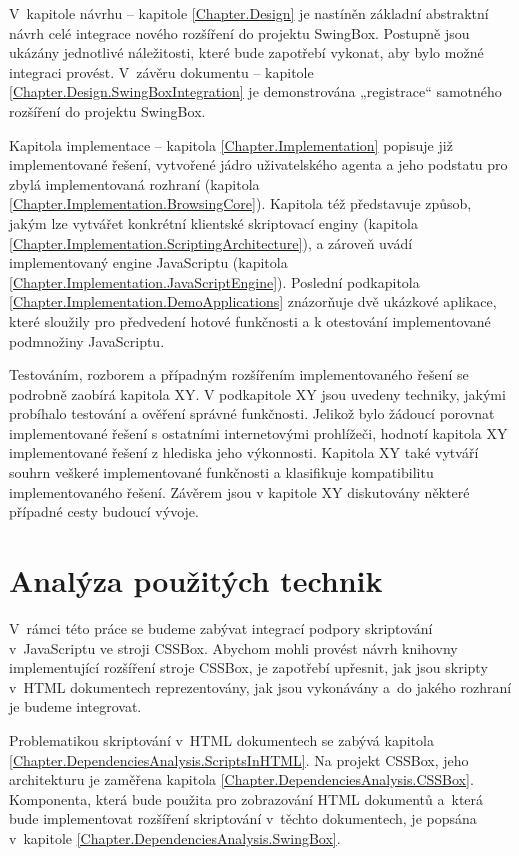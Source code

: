 V~kapitole návrhu -- kapitole \ref{Chapter.Design} je nastíněn základní abstraktní návrh celé integrace nového rozšíření do projektu SwingBox. Postupně jsou ukázány jednotlivé náležitosti, které bude zapotřebí vykonat, aby bylo možné integraci provést. V~závěru \linebreak[4]dokumentu -- kapitole \ref{Chapter.Design.SwingBoxIntegration} je demonstrována „registrace“ samotného rozšíření do projektu SwingBox.

Kapitola implementace -- kapitola \ref{Chapter.Implementation} popisuje již implementované řešení, vytvořené jádro uživatelského agenta a jeho podstatu pro zbylá implementovaná rozhraní (kapitola \ref{Chapter.Implementation.BrowsingCore}). Kapitola též představuje způsob, jakým lze vytvářet konkrétní klientské skriptovací enginy (kapitola \ref{Chapter.Implementation.ScriptingArchitecture}), a zároveň uvádí implementovaný engine JavaScriptu (kapitola \ref{Chapter.Implementation.JavaScriptEngine}). Poslední podkapitola \ref{Chapter.Implementation.DemoApplications} znázorňuje dvě ukázkové aplikace, které sloužily pro předvedení hotové funkčnosti a k otestování implementované podmnožiny JavaScriptu.

Testováním, rozborem a případným rozšířením implementovaného řešení se podrobně zaobírá kapitola XY. V podkapitole XY jsou uvedeny techniky, jakými probíhalo testování a ověření správné funkčnosti. Jelikož bylo žádoucí porovnat implementované řešení s ostatními internetovými prohlížeči, hodnotí kapitola XY implementované řešení z hlediska jeho výkonnosti. Kapitola XY také vytváří souhrn veškeré implementované funkčnosti a klasifikuje kompatibilitu implementovaného řešení. Závěrem jsou v kapitole XY diskutovány některé případné cesty budoucí vývoje.

\chapter{Analýza použitých technik}
\label{Chapter.DependenciesAnalysis}

V~rámci této práce se budeme zabývat integrací podpory skriptování v~JavaScriptu ve stroji CSSBox. Abychom mohli provést návrh knihovny implementující rozšíření stroje CSSBox, je zapotřebí upřesnit, jak jsou skripty v~HTML dokumentech reprezentovány, jak jsou vykonávány a~do jakého rozhraní je budeme integrovat.

Problematikou skriptování v~HTML dokumentech se zabývá kapitola \ref{Chapter.DependenciesAnalysis.ScriptsInHTML}. Na projekt CSSBox, jeho architekturu je zaměřena kapitola \ref{Chapter.DependenciesAnalysis.CSSBox}. Komponenta, která bude použita pro zobrazování HTML dokumentů a~která bude implementovat rozšíření skriptování v~těchto dokumentech, je popsána v~kapitole \ref{Chapter.DependenciesAnalysis.SwingBox}. 

